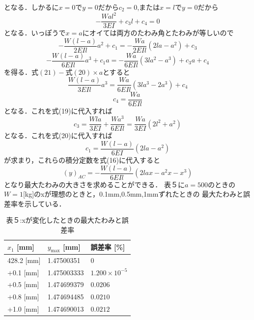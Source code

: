 \documentclass[a4paper,12pt]{jsarticle}
\begin{document}
\begin{enumerate}
\begin{equation}
\end{equation}
となる．しかるに$x=0$で$y=0$だから$c_2=0$,または$x=l$で$y=0$だから
\begin{equation} 
  {-\dfrac{Wal^2}{3EI}+c_3l+c_4}=0
\end{equation}
となる．いっぽうで$x=a$にオイては両方のたわみ角とたわみが等しいので
\begin{equation} 
  {-\dfrac{W(l-a)}{2EIl}a^2+c_1}={-\dfrac{Wa}{2EIl}(2la-a^2)+c_3}
\end{equation}
\begin{equation} 
  {-\dfrac{W(l-a)}{6EIl}a^3+c_1a}={-\dfrac{Wa}{6EIl}(3la^2-a^3)+c_3a+c_4}
\end{equation}
を得る．$式(21)-式(20) \times a$とすると
\begin{equation} 
  {\dfrac{W(l-a)}{3EIl}a^3}={\dfrac{Wa}{6EIl}(3la^3-2a^3)+c_4}
\end{equation}
\begin{equation} 
  c_4={\dfrac{Wa}{6EIl}}
\end{equation}
となる．これを式(19)に代入すれば
\begin{equation} 
  c_3={\dfrac{Wla}{3EI}+\dfrac{Wa^3}{6EIl}}={\dfrac{Wa}{3EI}(2l^2+a^2)}
\end{equation}
となる．これを式(20)に代入すれば
\begin{equation} 
  c_1={\dfrac{W(l-a)}{6EI}(2la-a^2)}
\end{equation}
が求まり，これらの積分定数を式(16)に代入すると
\begin{equation} 
  {(y)_{AC}}={-\dfrac{W(l-a)}{6EIl}(2lax-a^2x-x^3)}
\end{equation}
となり最大たわみの大きさを求めることができる．
表５に$a=500$のときの$W=1$[kg]のxが理想のときと，0.1mm,0.5mm,1mmずれたときの
最大たわみと誤差率を示している．\\
\begin{table}[h]
  \centering
  \caption*{表５:xが変化したときの最大たわみと誤差率}
  \label{tab:表５}
  \large
  \begin{tabular}{|p{3cm}|p{3cm}|p{4cm}|}
      \hline
      $x_1$ [mm] & $y_{\text{max}}$ [mm] & 誤差率 [\%] \\\hline
      428.2 [mm] & 1.47500351 & 0 \\\hline
      +0.1 [mm] & 1.475003333 & $1.200 \times 10^{-5}$ \\\hline
      +0.5 [mm] & 1.474699379 & $0.0206$ \\\hline
      +0.8 [mm] & 1.474694485 & $0.0210$ \\\hline
      +1.0 [mm] & 1.474690013 & $0.0212 $ \\\hline

\end{tabular}
\end{table}
\end{enumerate}
\end{document}
